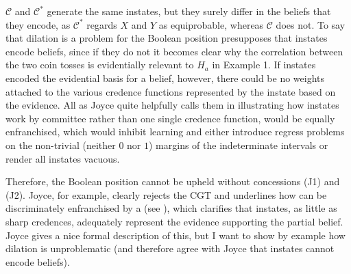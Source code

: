 \documentclass[11pt]{article}
\begin{document}

$\mathcal{C}$ and $\mathcal{C}^{*}$ generate the same instates, but
they surely differ in the beliefs that they encode, as
$\mathcal{C}^{*}$ regards $X$ and $Y$ as equiprobable, whereas
$\mathcal{C}$ does not. To say that dilation is a problem for the
Boolean position presupposes that instates encode beliefs, since if
they do not it becomes clear why the correlation between the two coin
tosses is evidentially relevant to $H_{a}$ in Example 1. If instates
encoded the evidential basis for a belief, however, there could be no
weights attached to the various credence functions represented by the
instate based on the evidence. All  as Joyce
quite helpfully calls them in illustrating how instates work by
committee rather than one single credence function, would be equally
enfranchised, which would inhibit learning and either introduce
regress problems on the non-trivial (neither $0$ nor $1$) margins of
the indeterminate intervals or render all instates vacuous.

Therefore, the Boolean position cannot be upheld without concessions
(J1) and (J2). Joyce, for example, clearly rejects the CGT and
underlines how  can be discriminately
enfranchised by a  (see
), which clarifies that instates, as little as
sharp credences, adequately represent the evidence supporting the
partial belief. Joyce gives a nice formal description of this, but I
want to show by example how dilation is unproblematic (and therefore
agree with Joyce that instates cannot encode beliefs).

\end{document}

